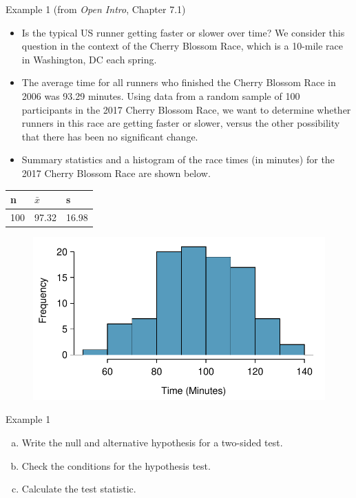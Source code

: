 \documentclass[fleqn, 10pt]{beamer}\usepackage[]{graphicx}\usepackage[]{color}
\begin{document}
\begin{frame}{Example 1 (from \emph{Open Intro}, Chapter 7.1)}
\small
\begin{itemize}
\item Is the typical US runner getting faster or slower over time? We consider this question in the context of the Cherry Blossom Race, which is a 10-mile race in Washington, DC each spring.
\item The average time for all runners who finished the Cherry Blossom Race in 2006 was 93.29 minutes.  Using data from a random sample of 100 participants in the 2017 Cherry Blossom Race,  we want to determine  whether runners in this race are getting faster or slower, versus the other possibility that there has been no significant change.
\item Summary statistics and a histogram of the race times (in minutes) for the 2017 Cherry Blossom Race are shown below.
\end{itemize}
\begin{table}[ht]
\begin{tabular}{lll}
\hline
n & $\bar{x}$ & s\\
\hline
100 & 97.32 & 16.98
\end{tabular}
\end{table}
\begin{figure}
\includegraphics[scale=0.4]{figure/run17SampTimeHistogram.pdf}
\end{figure}
\vspace{5pt}

\end{frame}

\begin{frame}{Example 1}
\begin{enumerate}[(a)]
\item Write the null and alternative hypothesis for a two-sided test.
\vspace{1cm}
\item Check the conditions for the hypothesis test.
\vspace{2.5cm}
\item Calculate the test statistic.
\vspace{2.5cm}
\end{enumerate}
\end{frame}
\end{document}
